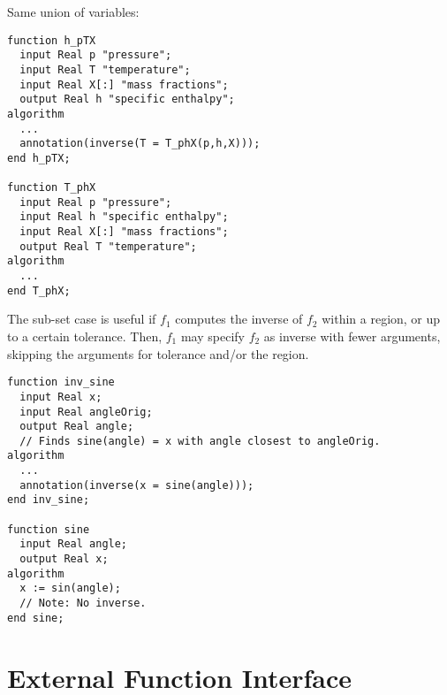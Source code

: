 \begin{example}
Same union of variables:
\begin{lstlisting}[language=modelica]
function h_pTX
  input Real p "pressure";
  input Real T "temperature";
  input Real X[:] "mass fractions";
  output Real h "specific enthalpy";
algorithm
  ...
  annotation(inverse(T = T_phX(p,h,X)));
end h_pTX;

function T_phX
  input Real p "pressure";
  input Real h "specific enthalpy";
  input Real X[:] "mass fractions";
  output Real T "temperature";
algorithm
  ...
end T_phX;
\end{lstlisting}
\end{example}

The sub-set case is useful if $f_1$ computes the inverse of $f_2$ within a region, or up to a certain tolerance.
Then, $f_1$ may specify $f_2$ as inverse with fewer arguments, skipping the arguments for tolerance and/or the region.

\begin{example}

\begin{lstlisting}[language=modelica]
function inv_sine
  input Real x;
  input Real angleOrig;
  output Real angle;
  // Finds sine(angle) = x with angle closest to angleOrig.
algorithm
  ...
  annotation(inverse(x = sine(angle)));
end inv_sine;

function sine
  input Real angle;
  output Real x;
algorithm
  x := sin(angle);
  // Note: No inverse.
end sine;
\end{lstlisting}
\end{example}
\section{External Function Interface}\label{external-function-interface}


